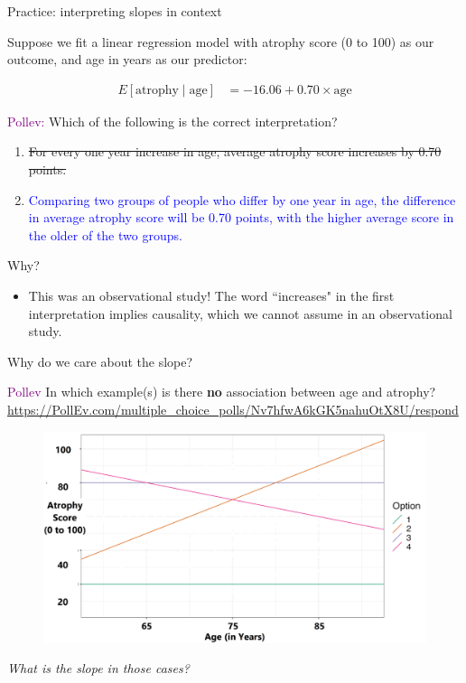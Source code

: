 \documentclass[10pt,t]{beamer}
\begin{document}
\begin{frame}{Practice: interpreting slopes in context}
	
	Suppose we fit a linear regression model with atrophy score (0 to 100) as our outcome, and age in years as our predictor:
	
	\begin{align*}
	E[\text{atrophy} \mid \text{age}] & = -16.06 + 0.70 \times \text{age}
	\end{align*}
	
	
	\textcolor{purple}{Pollev:} Which of the following is the correct interpretation?
	
	\begin{enumerate}
		\item \sout{For every one year increase in age, average atrophy score increases by 0.70 points.}
		\item \textcolor{blue}{Comparing two groups of people who differ by one year in age, the difference in average atrophy score will be 0.70 points, with the higher average score in the older of the two groups.}
	\end{enumerate}\pause

Why?
\begin{itemize}
	\item[] This was an observational study! The word ``increases" in the first interpretation implies causality, which we cannot assume in an observational study.
\end{itemize}

\end{frame}

\begin{frame}{Why do we care about the slope?}
	
	\vspace{-5 mm}
	
\textcolor{purple}{Pollev} In which example(s) is there \textbf{no} association between age and atrophy?
\url{https://PollEv.com/multiple_choice_polls/Nv7hfwA6kGK5nahuOtX8U/respond}
\vspace{0.3cm}

\begin{figure}
\centering \includegraphics[scale=0.35]{zeroslopes.png}
\end{figure}\pause

\vspace{0.2cm}

\textit{What is the slope in those cases?}

\end{frame}
\end{document}
